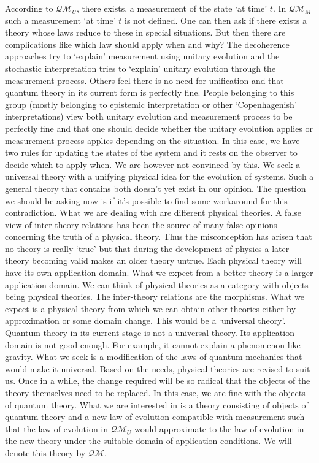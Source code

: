 \documentclass[11pt]{report}
\begin{document}
According to $\mathcal{QM}_U$, there exists, a measurement of the state `at time' $t$. In $\mathcal{QM}_M$ such a measurement `at time' $t$ is not defined. One can then ask if there exists a theory whose laws reduce to these in special situations. But then there are complications like which law should apply when and why? The decoherence approaches try to `explain' measurement using unitary evolution and the stochastic interpretation tries to `explain' unitary evolution through the measurement process. Others feel there is no need for unification and that quantum theory in its current form is perfectly fine. People belonging to this group (mostly belonging to epistemic interpretation or other `Copenhagenish' interpretations) view both unitary evolution and measurement process to be perfectly fine and that one should decide whether the unitary evolution applies or measurement process applies depending on the situation. In this case, we have two rules for updating the states of the system and it rests on the observer to decide which to apply when. We are however not convinced by this. We seek a universal theory with a unifying physical idea for the evolution of systems. Such a general theory that contains both doesn't yet exist in our opinion. The question we should be asking now is if it's possible to find some workaround for this contradiction. What we are dealing with are different physical theories. A false view of inter-theory relations has been the source of many false opinions concerning the truth of a physical theory. Thus the misconception has arisen that no theory is really `true' but that during the development of physics a later theory becoming valid makes an older theory untrue. Each physical theory will have its own application domain. What we expect from a better theory is a larger application domain. We can think of physical theories as a category with objects being physical theories. The inter-theory relations are the morphisms. What we expect is a physical theory from which we can obtain other theories either by approximation or some domain change. This would be a `universal theory'. Quantum theory in its current stage is not a universal theory. Its application domain is not good enough. For example, it cannot explain a phenomenon like gravity. What we seek is a modification of the laws of quantum mechanics that would make it universal. Based on the needs, physical theories are revised to suit us. Once in a while, the change required will be so radical that the objects of the theory themselves need to be replaced. In this case, we are fine with the objects of quantum theory. What we are interested in is a theory consisting of objects of quantum theory and a new law of evolution compatible with measurement such that the law of evolution in $\mathcal{QM}_U$ would approximate to the law of evolution in the new theory under the suitable domain of application conditions. We will denote this theory by $\mathcal{QM}$. 
\end{document}
